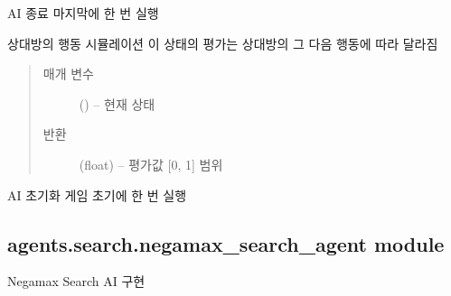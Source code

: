 \documentclass[letterpaper,10pt,english]{sphinxmanual}
\begin{document}
\begin{fulllineitems}
\begin{fulllineitems}
\end{fulllineitems}


\begin{fulllineitems}
\label{\detokenize{agents.search:agents.search.two_step_search_agent.TwoStepSearchAgent.close}}
AI 종료
마지막에 한 번 실행

\end{fulllineitems}


\begin{fulllineitems}
\label{\detokenize{agents.search:agents.search.two_step_search_agent.TwoStepSearchAgent.opponent_act}}
상대방의 행동 시뮬레이션
이 상태의 평가는 상대방의 그 다음 행동에 따라 달라짐
\begin{quote}\begin{description}
\item[{매개 변수}] \leavevmode
{} ({\hyperref[\detokenize{scripts:scripts.run_game.State}]{}}) -- 현재 상태

\item[{반환}] \leavevmode
(float) -- 평가값 {[}0, 1{]} 범위

\end{description}\end{quote}

\end{fulllineitems}


\begin{fulllineitems}
\label{\detokenize{agents.search:agents.search.two_step_search_agent.TwoStepSearchAgent.reset}}
AI 초기화
게임 초기에 한 번 실행

\end{fulllineitems}


\end{fulllineitems}



\subsection{agents.search.negamax\_search\_agent module}
\label{\detokenize{agents.search:module-agents.search.negamax_search_agent}}\label{\detokenize{agents.search:agents-search-negamax-search-agent-module}}
Negamax Search AI 구현
\end{document}
